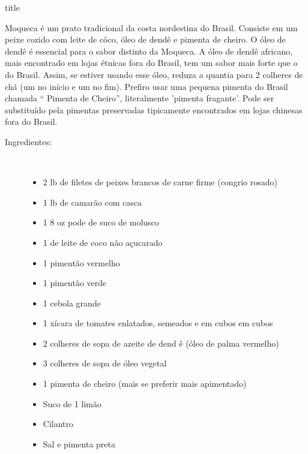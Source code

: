 \documentclass [11pt, letterpaper] {article}
\begin{document}
 {title}

Moqueca é um prato tradicional da costa nordestina do Brasil. Consiste em
um peixe cozido com leite de c\^oco, óleo de dend\^e e pimenta de cheiro.
O óleo de dend\^e é essencial para o sabor distinto da Moqueca. A \'oleo de dend\^e africano,
 mais encontrado em lojas étnicas fora do Brasil, tem um
sabor mais forte que o do Brasil. Assim, se estiver usando esse óleo,
reduza a quantia para 2 colheres de chá (um no início e um no
fim). Prefiro usar uma pequena pimenta do Brasil chamada `` Pimenta
de Cheiro'', literalmente 'pimenta fragante'. Pode ser substituído pela
pimentas preservadas tipicamente encontrados em lojas chinesas fora do Brasil.

\vspace {0.3in}

\begin {description}

\item [Ingredientes:] \ \\
\begin {itemize}
\item 2 lb de filetes de peixes brancos de carne firme (congrio rosado)
\item 1 lb de camarão com casca
\item 1 8 oz pode de suco de molusco
\item 1 de leite de coco não açucarado
\item 1 pimentão vermelho
\item 1 pimentão verde
\item 1 cebola grande
\item 1 xícara de tomates enlatados, semeados e em cubos em cubos
\item 2 colheres de sopa de azeite de dend \^ {e} (óleo de palma vermelho)
\item 3 colheres de sopa de óleo vegetal
\item 1 pimenta de cheiro (mais se preferir mais apimentado)
\item Suco de 1 limão
\item Cilantro
\item Sal e pimenta preta
\end {itemize}


\end{description}
\end{document}
